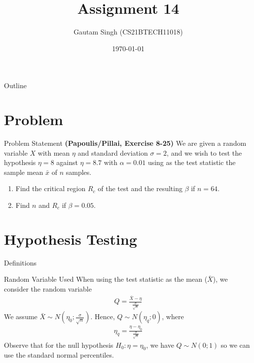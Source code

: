 \documentclass{beamer}
\title{Assignment 14}
\author{Gautam Singh (CS21BTECH11018)}
\date{\today}
\begin{document}
\begin{frame}
    \titlepage 
\end{frame}

\begin{frame}{Outline}
    \tableofcontents
\end{frame}

\section{Problem}
\begin{frame}{Problem Statement}
	\textbf{(Papoulis/Pillai, Exercise 8-25)} We are given a random variable $X$ with mean $\eta$ and standard deviation $\sigma = 2$, and we wish to test the hypothesis $\eta = 8$ against $\eta = 8.7$ with $\alpha = 0.01$ using as the test statistic the sample mean $\bar{x}$ of $n$ samples.
	\begin{enumerate}
		\item Find the critical region $R_c$ of the test and the resulting $\beta$ if $n = 64$. 
		\item Find $n$ and $R_c$ if $\beta = 0.05$.
	\end{enumerate}
\end{frame}

\section{Hypothesis Testing}
\begin{frame}{Definitions}
	\begin{alertblock}{Random Variable Used}
		When using the test statistic as the mean ($\bar{X}$), we consider the random variable
		\begin{align}
			Q = \frac{\bar{X} - \eta}{\frac{\sigma}{\sqrt{n}}}
			\label{eq:Q}
		\end{align}
		We assume $\bar{X} \sim N(\eta_0 ; \frac{\sigma}{\sqrt{n}})$. Hence, $Q \sim N(\eta_q ; 0)$, where
		\begin{align}
			\eta_q = \frac{\eta - \eta_0}{\frac{\sigma}{\sqrt{n}}}
			\label{eq:eta-q}
		\end{align}
		Observe that for the null hypothesis $H_0: \eta = \eta_0$, we have $Q \sim N(0; 1)$ so we can use the standard normal percentiles.
	\end{alertblock}
\end{frame}
\end{document}
